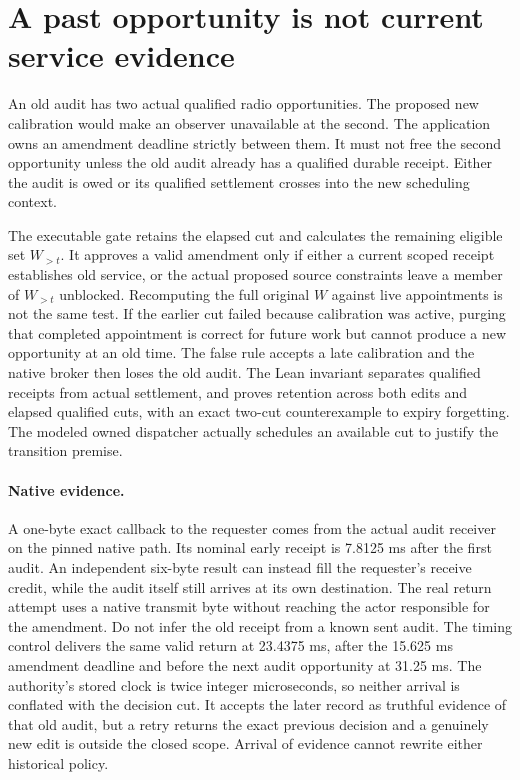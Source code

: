 \documentclass{article}
\begin{document}
\section*{A past opportunity is not current service evidence}
An old audit has two actual qualified radio opportunities.
The proposed new calibration would make an observer
unavailable at the second. The application owns an amendment
deadline strictly between them. It must not free the second
opportunity unless the old audit already has a qualified
durable receipt. Either the audit is owed or its qualified
settlement crosses into the new scheduling context.

The executable gate retains the elapsed cut and calculates the
remaining eligible set \(W_{>t}\). It approves a valid amendment
only if either a current scoped receipt establishes old service,
or the actual proposed source constraints leave a member of
\(W_{>t}\) unblocked. Recomputing the full original \(W\) against
live appointments is not the same test. If the earlier cut
failed because calibration was active, purging that completed
appointment is correct for future work but cannot produce a
new opportunity at an old time. The false rule accepts a late
calibration and the native broker then loses the old audit.
The Lean invariant separates qualified receipts from actual
settlement, and proves retention across both edits and elapsed
qualified cuts, with an exact two-cut counterexample to expiry
forgetting. The modeled owned dispatcher actually schedules an
available cut to justify the transition premise.

\paragraph{Native evidence.}
A one-byte exact callback to the requester comes from the
actual audit receiver on the pinned native path. Its nominal
early receipt is 7.8125 ms after the first audit. An independent
six-byte result can instead fill the requester's receive
credit, while the audit itself still arrives at its own
destination. The real return attempt uses a native transmit
byte without reaching the actor responsible for the amendment.
Do not infer the old receipt from a known sent audit. The timing
control delivers the same valid return at 23.4375 ms, after
the 15.625 ms amendment deadline and before the next audit
opportunity at 31.25 ms. The authority's stored clock is twice
integer microseconds, so neither arrival is conflated with the
decision cut. It accepts the later record as truthful evidence
of that old audit, but a retry returns the exact previous
decision and a genuinely new edit is outside the closed scope.
Arrival of evidence cannot rewrite either historical policy.
\end{document}
